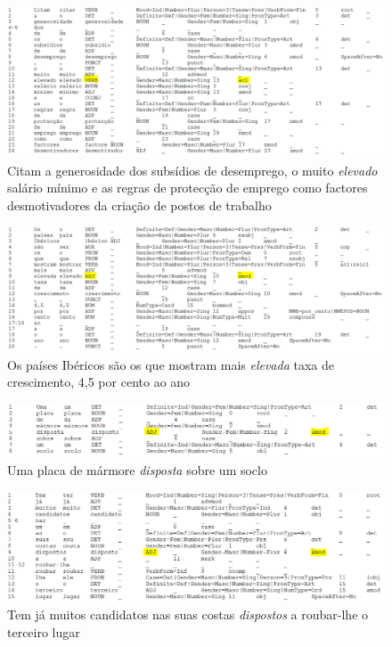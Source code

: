 \documentclass[output=paper,colorlinks,citecolor=brown]{langscibook}
\begin{document}
\begin{enumerate}
		\begin{figure}
			\centering
			\includegraphics[width=\textwidth,height=\textheight,keepaspectratio]{imagesDrive/elevado1.png}
			\caption{Citam a generosidade dos subsídios de desemprego, o muito \emph{elevado} salário mínimo e as regras de protecção de emprego como factores desmotivadores da criação de postos de trabalho}	
			\label{fig:elevado1}
		\end{figure}

		\begin{figure}
			\centering
			\includegraphics[width=\textwidth,height=\textheight,keepaspectratio]{imagesDrive/elevado2.png}
			\caption{Os países Ibéricos são os que mostram mais \emph{elevada} taxa de crescimento, 4,5 por cento ao ano}	
			\label{fig:elevado2}
		\end{figure}

		\begin{figure}
			\centering
			\includegraphics[width=\textwidth,height=\textheight,keepaspectratio]{imagesDrive/disposto1.png}
			\caption{Uma placa de mármore \emph{disposta} sobre um soclo}	
			\label{fig:disposto1}
		\end{figure}

		\begin{figure}
			\centering
			\includegraphics[width=\textwidth,height=\textheight,keepaspectratio]{imagesDrive/disposto2.png}
			\caption{Tem já muitos candidatos nas suas costas \emph{dispostos} a roubar-lhe o terceiro lugar}	
			\label{fig:disposto2}
		\end{figure}


\end{enumerate}
\end{document}
